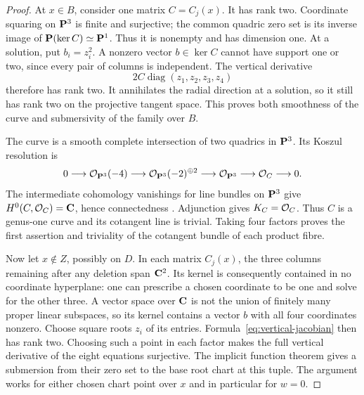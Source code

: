\begin{proof}
At $x\in B$, consider one matrix $C=C_j(x)$. It has rank two. Coordinate squaring on $\mathbf P^3$ is finite and surjective; the common quadric zero set is its inverse image of $\mathbf P(\ker C)\simeq\mathbf P^1$. Thus it is nonempty and has dimension one. At a solution, put $b_i=z_i^2$. A nonzero vector $b\in\ker C$ cannot have support one or two, since every pair of columns is independent. The vertical derivative
\begin{equation}\label{eq:vertical-jacobian}
 2C\operatorname{diag}(z_1,z_2,z_3,z_4)
\end{equation}
therefore has rank two. It annihilates the radial direction at a solution, so it still has rank two on the projective tangent space. This proves both smoothness of the curve and submersivity of the family over $B$.

The curve is a smooth complete intersection of two quadrics in $\mathbf P^3$. Its Koszul resolution is
\[
 0\longrightarrow\mathcal O_{\mathbf P^3}(-4)
 \longrightarrow\mathcal O_{\mathbf P^3}(-2)^{\oplus2}
 \longrightarrow\mathcal O_{\mathbf P^3}
 \longrightarrow\mathcal O_C\longrightarrow0.
\]
The intermediate cohomology vanishings for line bundles on $\mathbf P^3$ give $H^0(C,\mathcal O_C)=\mathbf C$, hence connectedness \cite[Tag~01XS]{Stacks}. Adjunction gives $K_C=\mathcal O_C$. Thus $C$ is a genus-one curve and its cotangent line is trivial. Taking four factors proves the first assertion and triviality of the cotangent bundle of each product fibre.

Now let $x\notin Z$, possibly on $D$. In each matrix $C_j(x)$, the three columns remaining after any deletion span $\mathbf C^2$. Its kernel is consequently contained in no coordinate hyperplane: one can prescribe a chosen coordinate to be one and solve for the other three. A vector space over $\mathbf C$ is not the union of finitely many proper linear subspaces, so its kernel contains a vector $b$ with all four coordinates nonzero. Choose square roots $z_i$ of its entries. Formula~\eqref{eq:vertical-jacobian} then has rank two. Choosing such a point in each factor makes the full vertical derivative of the eight equations surjective. The implicit function theorem gives a submersion from their zero set to the base root chart at this tuple. The argument works for either chosen chart point over $x$ and in particular for $w=0$.
\end{proof}

